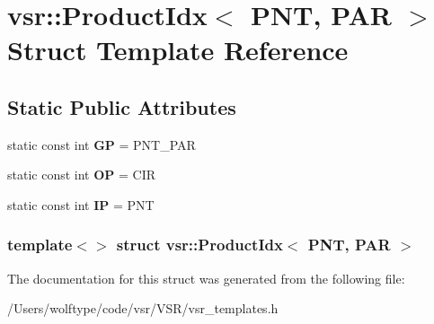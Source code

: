 \hypertarget{structvsr_1_1_product_idx_3_01_p_n_t_00_01_p_a_r_01_4}{\section{vsr\-:\-:Product\-Idx$<$ P\-N\-T, P\-A\-R $>$ Struct Template Reference}
\label{structvsr_1_1_product_idx_3_01_p_n_t_00_01_p_a_r_01_4}
}
\subsection*{Static Public Attributes}
\begin{DoxyCompactItemize}
\item 
\hypertarget{structvsr_1_1_product_idx_3_01_p_n_t_00_01_p_a_r_01_4_aa58bde3b9110122000dfa18adc09b59a}{static const int {\bfseries G\-P} = P\-N\-T\-\_\-\-P\-A\-R}\label{structvsr_1_1_product_idx_3_01_p_n_t_00_01_p_a_r_01_4_aa58bde3b9110122000dfa18adc09b59a}

\item 
\hypertarget{structvsr_1_1_product_idx_3_01_p_n_t_00_01_p_a_r_01_4_a4724263e9843b9657b35a40aa6611452}{static const int {\bfseries O\-P} = C\-I\-R}\label{structvsr_1_1_product_idx_3_01_p_n_t_00_01_p_a_r_01_4_a4724263e9843b9657b35a40aa6611452}

\item 
\hypertarget{structvsr_1_1_product_idx_3_01_p_n_t_00_01_p_a_r_01_4_ac09c0e470605c727ef0abb7c1c60f44b}{static const int {\bfseries I\-P} = P\-N\-T}\label{structvsr_1_1_product_idx_3_01_p_n_t_00_01_p_a_r_01_4_ac09c0e470605c727ef0abb7c1c60f44b}

\end{DoxyCompactItemize}
\subsubsection*{template$<$$>$ struct vsr\-::\-Product\-Idx$<$ P\-N\-T, P\-A\-R $>$}



The documentation for this struct was generated from the following file\-:\begin{DoxyCompactItemize}
\item 
/\-Users/wolftype/code/vsr/\-V\-S\-R/vsr\-\_\-templates.\-h\end{DoxyCompactItemize}
